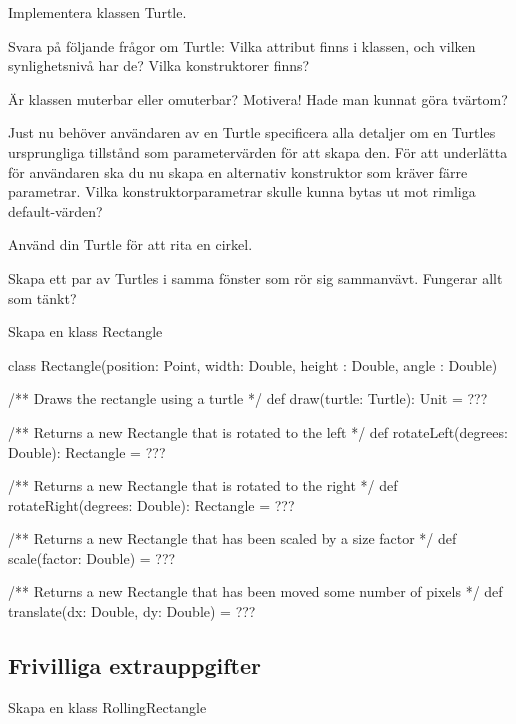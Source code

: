 \Subtask Implementera klassen Turtle.

\Subtask Svara på följande frågor om Turtle: Vilka attribut finns i klassen, och vilken synlighetsnivå har de? Vilka konstruktorer finns? 

\Subtask Är klassen muterbar eller omuterbar? Motivera! Hade man kunnat göra tvärtom?

\Subtask Just nu behöver användaren av en Turtle specificera alla detaljer om en Turtles ursprungliga tillstånd som parametervärden för att skapa den. För att underlätta för användaren ska du nu skapa en alternativ konstruktor som kräver färre parametrar. Vilka konstruktorparametrar skulle kunna bytas ut mot rimliga default-värden?

\Subtask Använd din Turtle för att rita en cirkel.

\Subtask Skapa ett par av Turtles i samma fönster som rör sig sammanvävt. Fungerar allt som tänkt?

\Task Skapa en klass Rectangle
\begin{ScalaSpec}
class Rectangle(position: Point, width: Double, height : Double, angle : Double) {
  /** Draws the rectangle using a turtle */
  def draw(turtle: Turtle): Unit = ???

  /** Returns a new Rectangle that is rotated to the left */
  def rotateLeft(degrees: Double): Rectangle = ???

  /** Returns a new Rectangle that is rotated to the right */
  def rotateRight(degrees: Double): Rectangle = ???

  /** Returns a new Rectangle that has been scaled by a size factor */
  def scale(factor: Double) = ???

  /** Returns a new Rectangle that has been moved some number of pixels */
  def translate(dx: Double, dy: Double) = ???
}
\end{ScalaSpec}

\subsection{Frivilliga extrauppgifter}


\Task Skapa en klass RollingRectangle


